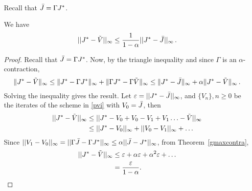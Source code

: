 Recall that $\bar{J} = \Gamma J^*$.
\begin{theorem}\label{fxpres}
We have 
\begin{align}
||J^*-\tilde{V}||_\infty\leq \frac{1}{1-\alpha}||J^*-\bar{J}||_\infty\,.
\end{align}
\end{theorem}
\begin{proof}
Recall that $\bar{J} = \Gamma J^*$.
Now, by the triangle inequality and since $\Gamma$ is an $\alpha$-contraction,
\begin{align*}
\|J^* - \tilde{V} \|_{\infty} \le \| J^* - \Gamma J^* \|_{\infty} + \|\Gamma J^* - \Gamma \tilde{V} \|_{\infty}
\le  \| J^* - \bar{J} \|_{\infty} + \alpha \|J^* - \tilde{V}\|_{\infty}\,.
\end{align*}
Solving the inequality gives the result.
Let $\varepsilon=||J^*-\bar{J}||_\infty$, and $\{V_n\},n\geq 0$ be the iterates of the scheme in \eqref{pvi} with $V_0=\bar{J}$, then
\begin{align}
||J^*-\tilde{V}||_\infty&\leq ||J^*-V_0+V_0-V_1+V_1\ldots-\tilde{V}||_\infty\nonumber\\
&\leq ||J^*-V_0||_\infty+||V_0-V_1||_\infty+\ldots\nonumber
\end{align}
Since $||V_1-V_0||_\infty=||\Gamma \bar{J}-\Gamma J^*||_\infty\leq\alpha||\bar{J}-J^*||_\infty$, from Theorem~\ref{gmaxcontra},
\begin{align}
||J^*-\tilde{V}||_\infty&\leq \varepsilon+\alpha\varepsilon+\alpha^2\varepsilon+\ldots\nonumber\\
&=\frac{\varepsilon}{1-\alpha}.
\end{align}
\fi
\end{proof}
